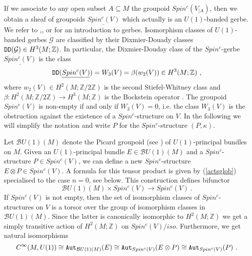 \documentclass[12pt]{article}
\newcommand{\Aut}{{\tt Aut}}
\newcommand{\cB}{{\mathcal{B}}}
\newcommand{\DD}{{\tt DD}}
\newcommand{\cG}{{\mathcal{G}}}
\newcommand{\Z}{{\mathbb{Z}}}
\begin{document}
If we associate to any open subset
 $A\subseteq M$ the groupoid $Spin^{c}(V_{|A})$,  then we obtain a sheaf of groupoids $\underline{Spin^{c}(V)}$ which actually 
is an $U(1)$-banded gerbe. We refer to \cite{MR2362847},\cite{MR2681698}, or \cite{MR1876068} for an introduction to gerbes. 
Isomorphism classes of $U(1)$-banded gerbes $\cG$ are classified by their Dixmier-Douady classes
$\DD(\cG)\in H^{3}(M;\Z)$. In particular,  the Dixmier-Douday class of the $Spin^{c}$-gerbe  $\underline{Spin^{c}(V)}$
  is the class
$$\DD(\underline{Spin^{c}(V)})=W_{3}(V)=\beta (w_{2}(V))\in H^{3}(M;\Z)\ ,$$ where
$w_{2}(V)\in H^{2}(M;\Z/2\Z)$ is the second Stiefel-Whitney class and $\beta:H^{2}(M;\Z/2\Z)\to H^{3}(M;\Z)$ is the Bockstein operator \cite[Thm. D2]{MR1031992}. The groupoid $Spin^{c}(V)$ is non-empty  if and only if $W_{3}(V)=0$, i.e. the class $W_{3}(V)$ is the obstruction against the existence of a $Spin^{c}$-structure on $V$. 
 In the following we will simplify the notation and write $P$ for the $Spin^{c}$-structure $(P,\kappa)$.  
 
Let $\cB U(1)(M)$ denote the Picard groupoid (see \cite{del73}) of $U(1)$-principal bundles  on $M$.
Given an $U(1)$-principal bundle $E\in \cB U(1)(M)$ and a $Spin^{c}$-structure
$P\in Spin^{c}(V)$,  we can define a new $Spin^{c}$-structure
$E\otimes P\in Spin^{c}(V)$. 
A  formula for this tensor product is given by (\ref{actsglob}) specialised to the case $n=0$, see below.  This construction defines bifunctor
\begin{equation}\label{acts}\cB U(1)(M)\times Spin^{c}(V)\to Spin^{c}(V)\ .\end{equation}
If $Spin^{c}(V)$ is not empty, then the set of isomorphism classes of $Spin^{c}$-structures on $V$ is a torsor over the group of isomorphism classes in $\cB U(1)(M)$. Since the latter is canonically isomorphic to $H^{2}(M;\Z)$ we get a simply transitive
action of $H^{2}(M;\Z)$ on $Spin^{c}(V)/iso$.
Furthermore,  we get natural isomorphisms
$$C^{\infty}(M,U(1))\cong \Aut_{\cB U(1) (M)}(E)\cong \Aut_{Spin^{c}(V)}(E\otimes P)\cong \Aut_{Spin^{c}(V)}(P)\ .$$
\end{document}
